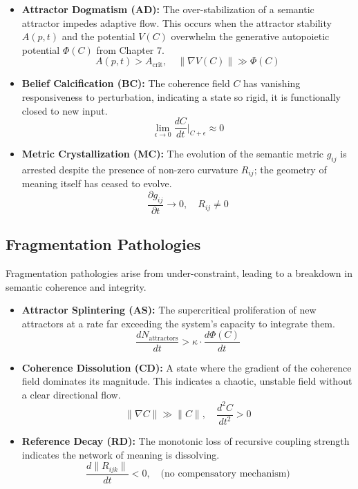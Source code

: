 \begin{itemize}
    \item \textbf{Attractor Dogmatism (AD):} The over-stabilization of a semantic attractor impedes adaptive flow. This occurs when the attractor stability \(A(p,t)\) and the potential \(V(C)\) overwhelm the generative autopoietic potential \(\Phi(C)\) from Chapter 7.
    \begin{equation}
    A(p,t) > A_{\text{crit}}, \quad \|\nabla V(C)\| \gg \Phi(C)
    \end{equation}

    \item \textbf{Belief Calcification (BC):} The coherence field \(C\) has vanishing responsiveness to perturbation, indicating a state so rigid, it is functionally closed to new input.
    \begin{equation}
    \lim_{\epsilon \to 0} \frac{dC}{dt}\bigg|_{C+\epsilon} \approx 0
    \end{equation}

    \item \textbf{Metric Crystallization (MC):} The evolution of the semantic metric \(g_{ij}\) is arrested despite the presence of non-zero curvature \(R_{ij}\); the geometry of meaning itself has ceased to evolve.
    \begin{equation}
    \frac{\partial g_{ij}}{\partial t} \to 0, \quad R_{ij} \neq 0
    \end{equation}
\end{itemize}

\subsection{Fragmentation Pathologies}

Fragmentation pathologies arise from under-constraint, leading to a breakdown in semantic coherence and integrity.

\begin{itemize}
    \item \textbf{Attractor Splintering (AS):} The supercritical proliferation of new attractors at a rate far exceeding the system's capacity to integrate them.
    \begin{equation}
    \frac{dN_{\text{attractors}}}{dt} > \kappa \cdot \frac{d\Phi(C)}{dt}
    \end{equation}

    \item \textbf{Coherence Dissolution (CD):} A state where the gradient of the coherence field dominates its magnitude. This indicates a chaotic, unstable field without a clear directional flow.
    \begin{equation}
    \|\nabla C\| \gg \|C\|, \quad \frac{d^2C}{dt^2} > 0
    \end{equation}

    \item \textbf{Reference Decay (RD):} The monotonic loss of recursive coupling strength indicates the network of meaning is dissolving.
    \begin{equation}
    \frac{d\|R_{ijk}\|}{dt} < 0, \quad \text{(no compensatory mechanism)}
    \end{equation}
\end{itemize}

